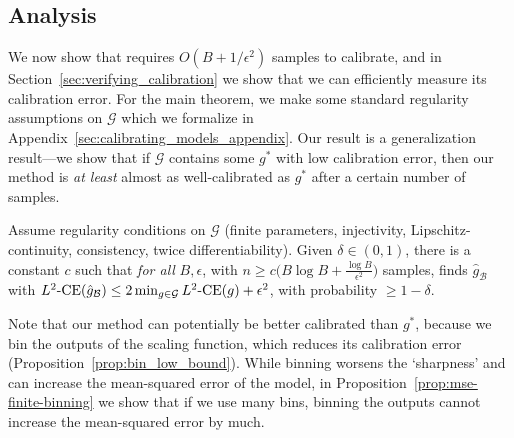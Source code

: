 

\subsection{Analysis}

We now show that \ourcal{} requires $O(B + 1/\epsilon^2)$ samples to calibrate, and in Section~\ref{sec:verifying_calibration} we show that we can efficiently measure its calibration error. For the main theorem, we make some standard regularity assumptions on $\mathcal{G}$ which we formalize in Appendix~\ref{sec:calibrating_models_appendix}. Our result is a generalization result---we show that if $\mathcal{G}$ contains some $g^*$ with low calibration error, then our method is \emph{at least} almost as well-calibrated as $g^*$ after a certain number of samples.

\newcommand{\finalCalibText}{
Assume regularity conditions on $\mathcal{G}$ (finite parameters, injectivity, Lipschitz-continuity, consistency, twice differentiability). Given $\delta \in (0, 1)$, there is a constant $c$ such that \emph{for all} $B, \epsilon$, with $n \geq c \Big(B\log{B} + \frac{\log{B}}{\epsilon^2}\Big)$ samples, \ourcal{} finds $\hat{g}_{\mathcal{B}}$ with $\squaredce(\hat{g}_{\mathcal{B}}) \leq 2\min_{g \in \mathcal{G}}\squaredce(g) + \epsilon^2$, with probability $\geq 1 - \delta$.
}

\begin{theorem}
\label{thm:final-calib}
\finalCalibText{}
\end{theorem}

\newtheorem*{finalCalib}{Restatement of Theorem~\ref{thm:final-calib}}


Note that our method can potentially be better calibrated than $g^*$, because we bin the outputs of the scaling function, which reduces its calibration error (Proposition~\ref{prop:bin_low_bound}). While binning worsens the `sharpness' and can increase the mean-squared error of the model, in Proposition~\ref{prop:mse-finite-binning} we show that if we use many bins, binning the outputs cannot increase the mean-squared error by much.

